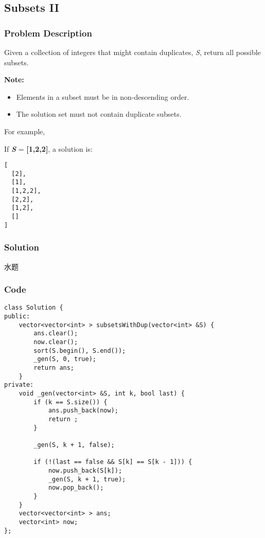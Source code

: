 \documentclass[courier]{article}
\begin{document}
\begin{CJK*}{UTF8}{gkai}
\subsection{ Subsets II }

\subsubsection*{Problem Description}
Given a collection of integers that might contain duplicates, \emph{S}, return all possible subsets.

\textbf{Note:}



\begin{itemize}
\item Elements in a subset must be in non-descending order.
\item The solution set must not contain duplicate subsets.
\end{itemize}

For example,


If \textbf{\emph{S}} = \textbf{[1,2,2]}, a solution is:

\begin{verbatim}
[
  [2],
  [1],
  [1,2,2],
  [2,2],
  [1,2],
  []
]
\end{verbatim}


\subsubsection*{Solution}
水题

\subsubsection*{Code}
\begin{lstlisting}
class Solution {
public:
    vector<vector<int> > subsetsWithDup(vector<int> &S) {
        ans.clear();
        now.clear();
        sort(S.begin(), S.end());
        _gen(S, 0, true);
        return ans;
    }
private:
    void _gen(vector<int> &S, int k, bool last) {
        if (k == S.size()) {
            ans.push_back(now);
            return ;
        }
        
        _gen(S, k + 1, false);
        
        if (!(last == false && S[k] == S[k - 1])) {
            now.push_back(S[k]);
            _gen(S, k + 1, true);
            now.pop_back();
        }
    }
    vector<vector<int> > ans;
    vector<int> now;
}; 
\end{lstlisting}



\end{CJK*}
\end{document}
